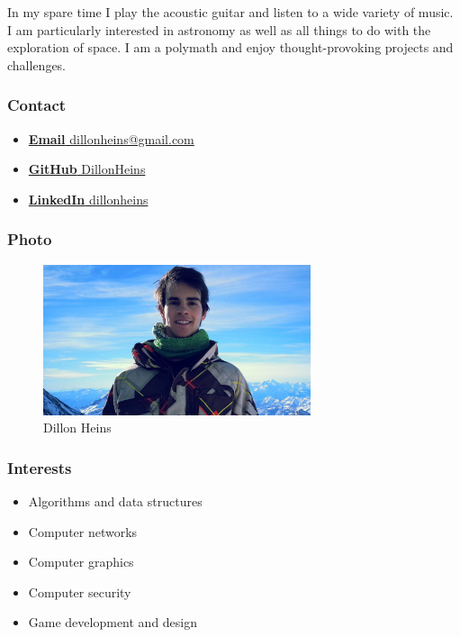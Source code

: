 \documentclass{article}
\begin{document}
	In my spare time I play the acoustic guitar and listen to a wide variety of music. I am particularly interested in astronomy as well as all things to do with the exploration of space. I am a polymath and enjoy thought-provoking projects and challenges.
	\subsubsection{Contact}
		\begin{itemize}
			\item \href{mailto:dillonheins@gmail.com}{\textbf{Email} dillonheins@gmail.com}
			\item \href{https://github.com/DillonHeins}{\textbf{GitHub} DillonHeins}
			\item \href{za.linkedin.com/in/dillonheins}{\textbf{LinkedIn} dillonheins}
		\end{itemize}
	\subsubsection{Photo}
		\begin{figure}[H]
			\centering
			\includegraphics[width=0.7\textwidth]{../dillon.jpg}
			\caption{Dillon Heins}
		\end{figure}
	\subsubsection{Interests}
		\begin{itemize}
			\item Algorithms and data structures
			\item Computer networks
			\item Computer graphics
			\item Computer security
			\item Game development and design
		\end{itemize}
\end{document}
